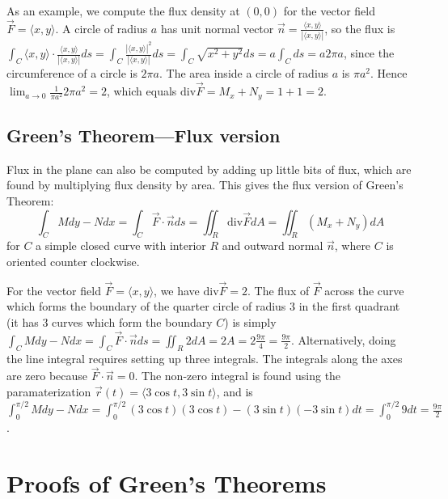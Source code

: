 \begin{example}
As an example, we compute the flux density at $(0,0)$ for the vector
field $\vec F = \langle x,y\rangle$. A circle of radius $a$ has unit
normal vector $\vec n = \frac{\langle x,y\rangle}{|\langle x,y\rangle|}$,
so the flux is $\int_C \langle x,y\rangle\cdot
\frac{\langle x,y\rangle}{|\langle x,y\rangle|}ds 
= \int_C\frac{|\langle x,y\rangle|^2}{|\langle x,y\rangle|}ds=\int_C \sqrt{x^2+y^2}ds 
= a \int_C ds   = a2\pi a$, since the circumference of a circle is $2\pi a$.
The area inside a circle of radius $a$ is $\pi a^2$. Hence $\lim_{a\to
0}\frac{1}{\pi a^2}2\pi a^2 = 2$, which equals $\text{div}\vec F = M_x+N_y
= 1+1=2$. 
\end{example}



\subsection{Green's Theorem---Flux version}

Flux in the plane can also be computed by adding up little bits of
flux, which are found by multiplying flux density by area.  This
gives the flux version of Green's Theorem:
$$ \int_C Mdy-Ndx = \int_C\vec F\cdot \vec n ds = \iint_R \text{div}\vec F dA =
\iint_R \left(M_x+N_y\right) dA $$
for $C$ a simple closed curve with interior $R$ and outward normal
$\vec n$, where $C$ is oriented counter clockwise.

\begin{example}
For the vector field $\vec F = \langle x,y\rangle$, we have $\text{div}\vec F = 2$.
The flux of $\vec F$ across the curve which forms the boundary of the
quarter circle of radius 3 in the first quadrant (it has 3 curves
which form the boundary $C$) is simply $\int_C Mdy-Ndx = \int_C \vec F\cdot \vec
n ds = \iint_R 2 dA = 2A = 2\frac{9\pi}{4} =
\frac{9\pi}{2}$. Alternatively, doing the line integral requires setting
up three integrals. The integrals along the axes are zero because
$\vec F\cdot \vec n = 0$. The non-zero integral is found using the
paramaterization $\vec r(t) = \langle3\cos t,3\sin t\rangle$, and is
$\int_0^{\pi/2}Mdy-Ndx =\int_0^{\pi/2}(3\cos t)( 3\cos t)-(3 \sin t) (-3\sin
t)dt =\int_0^{\pi/2}9dt =\frac{9\pi}{2}$.
\end{example}





\section{Proofs of Green's Theorems}

